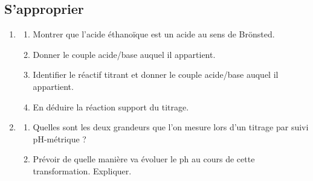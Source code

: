 \documentclass[a4paper,11pt,fleqn]{article}%
\begin{document}
\subsection*{S'approprier}
\begin{enumerate}
	\item \begin{enumerate}
		\item Montrer que l'acide éthanoïque est un acide au sens de Brönsted.
		\item Donner le couple acide/base auquel il appartient.
		\item Identifier le réactif titrant et donner le couple acide/base auquel il appartient.
		\item En déduire la réaction support du titrage.
	\end{enumerate}
	\item \begin{enumerate}
		\item Quelles sont les deux grandeurs que l'on mesure lors d'un titrage par suivi pH-métrique ?
		\item Prévoir de quelle manière va évoluer le ph au cours de cette transformation. Expliquer.
	\end{enumerate}
 \end{enumerate}
\end{document}
